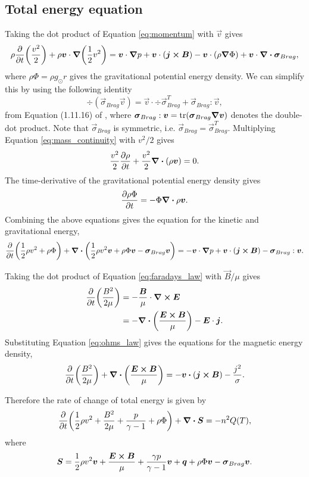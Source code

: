\subsection{Total energy equation}
\label{sec:intro_total_energy_eqn}

Taking the dot product of Equation \eqref{eq:momentum} with $\vec{v}$ gives
\[\rho\pdv{}{t}\qty(\frac{v^2}{2}) + \rho\boldsymbol{v}\cdot\grad(\frac{1}{2}v^2)=\boldsymbol{v}\cdot\grad{p} + \boldsymbol{v}\cdot(\boldsymbol{j}\cross\boldsymbol{B}) - \boldsymbol{v}\cdot(\rho\grad{\Phi})+\boldsymbol{v}\cdot\div{\boldsymbol{\sigma}_{Brag}},\]
where $\rho\Phi=\rho g_{\odot}r$ gives the gravitational potential energy density. We can simplify this by using the following identity 
\[\div(\vec{\sigma}_{Brag}\vec{v})=\vec{v}\cdot\div{\vec{\sigma}_{Brag}^T} + \vec{\sigma}_{Brag}:\vec{v},\]
from Equation (1.11.16) of \citet{Kelly2020}, where $\boldsymbol{\sigma}_{Brag}:\boldsymbol{v}=\tr(\boldsymbol{\sigma}_{Brag}\grad{\boldsymbol{v}})$ denotes the double-dot product. Note that $\vec{\sigma}_{Brag}$ is symmetric, i.e. $\vec{\sigma}_{Brag}=\vec{\sigma}_{Brag}^T$.
Multiplying Equation \eqref{eq:mass_continuity} with $v^2/2$ gives
\[\frac{v^2}{2}\pdv{\rho}{t}+\frac{v^2}{2}\div(\rho\boldsymbol{v})=0.\]
The time-derivative of the gravitational potential energy density gives
\[\pdv{\rho\Phi}{t}=-\Phi\div{\rho\boldsymbol{v}}.\]
Combining the above equations gives the equation for the kinetic and gravitational energy,
\[
    \pdv{}{t}\qty(\frac{1}{2}\rho v^2 + \rho\Phi) + \div\qty(\frac{1}{2}\rho v^2\boldsymbol{v}+\rho\Phi\boldsymbol{v} - \boldsymbol{\sigma}_{Brag}\boldsymbol{v})=-\boldsymbol{v}\cdot\grad{p}+\boldsymbol{v}\cdot(\boldsymbol{j}\cross\boldsymbol{B})-\boldsymbol{\sigma}_{Brag}:\boldsymbol{v}.
\]

Taking the dot product of Equation \eqref{eq:faradays_law} with $\vec{B}/\mu$ gives
\[\begin{aligned}
\pdv{}{t}\qty(\frac{B^2}{2\mu})&=-\frac{\boldsymbol{B}}{\mu}\cdot\curl{\boldsymbol{E}} \\
&=-\div(\frac{\boldsymbol{E}\cross\boldsymbol{B}}{\mu})-\boldsymbol{E}\cdot\boldsymbol{j}.
\end{aligned}\]
Substituting Equation \eqref{eq:ohms_law} gives the equations for the magnetic energy density,
\[
    \pdv{}{t}\qty(\frac{B^2}{2\mu})+\div(\frac{\vec{E}\cross\vec{B}}{\mu})=-\vec{v}\vdot(\vec{j}\cross\vec{B})-\frac{j^2}{\sigma}.
\]

Therefore the rate of change of total energy is given by
\begin{equation}
    \pdv{}{t}\qty(\frac{1}{2}\rho v^2 + \frac{B^2}{2\mu}+\frac{p}{\gamma-1}+\rho\Phi)+\div{\boldsymbol{S}}=-n^2Q(T),
\end{equation}
where
\begin{equation}
    \boldsymbol{S} = \frac{1}{2}\rho v^2\boldsymbol{v} + \frac{\boldsymbol{E}\cross\boldsymbol{B}}{\mu} + \frac{\gamma p}{\gamma - 1}\boldsymbol{v} + \boldsymbol{q} + \rho\Phi\boldsymbol{v} - \boldsymbol{\sigma}_{Brag}\boldsymbol{v}.
\end{equation}

